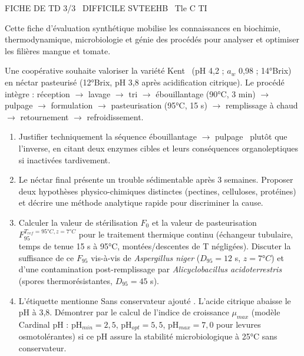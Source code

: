 \documentclass[11pt]{article}
\begin{document}
\begin{tcolorbox}[enhanced,colback=popink,colframe=popink,arc=10pt,boxrule=0pt,left=12pt,right=12pt,top=9pt,bottom=9pt]
{\color{white}\popxbold\small FICHE DE TD 3/3 \textbullet\ DIFFICILE \hfill SVTEEHB \textbullet\ Tle C TI\par}
\end{tcolorbox}
\vspace{4pt}
Cette fiche d'évaluation synthétique mobilise les connaissances en biochimie, thermodynamique, microbiologie et génie des procédés pour analyser et optimiser les filières mangue et tomate.

\begin{exercice}
Une coopérative souhaite valoriser la variété \og Kent \fg\ (pH 4,2 ; $a_w$ 0,98 ; 14°Brix) en néctar pasteurisé (12°Brix, pH 3,8 après acidification citrique). Le procédé intègre : réception $\rightarrow$ lavage $\rightarrow$ tri $\rightarrow$ ébouillantage (90°C, 3 min) $\rightarrow$ pulpage $\rightarrow$ formulation $\rightarrow$ pasteurisation (95°C, 15 s) $\rightarrow$ remplissage à chaud $\rightarrow$ retournement $\rightarrow$ refroidissement.
\begin{enumerate}
    \item Justifier techniquement la séquence \og ébouillantage $\rightarrow$ pulpage \fg\ plutôt que l'inverse, en citant deux enzymes cibles et leurs conséquences organoleptiques si inactivées tardivement.
    \item Le néctar final présente un trouble sédimentable après 3 semaines. Proposer deux hypothèses physico-chimiques distinctes (pectines, celluloses, protéines) et décrire une méthode analytique rapide pour discriminer la cause.
    \item Calculer la valeur de stérilisation $F_0$ et la valeur de pasteurisation $F_{95}^{T_{ref}=95°C, z=7°C}$ pour le traitement thermique continu (échangeur tubulaire, temps de tenue 15 s à 95°C, montées/descentes de T négligées). Discuter la suffisance de ce $F_{95}$ vis-à-vis de \textit{Aspergillus niger} ($D_{95}=12$ s, $z=7°C$) et d'une contamination post-remplissage par \textit{Alicyclobacillus acidoterrestris} (spores thermorésistantes, $D_{95}=45$ s).
    \item L'étiquette mentionne \og Sans conservateur ajouté \fg. L'acide citrique abaisse le pH à 3,8. Démontrer par le calcul de l'indice de croissance $\mu_{max}$ (modèle Cardinal pH : pH$_{min}=2,5$, pH$_{opt}=5,5$, pH$_{max}=7,0$ pour levures osmotolérantes) si ce pH assure la stabilité microbiologique à 25°C sans conservateur.
\end{enumerate}
\end{exercice}
\end{document}
